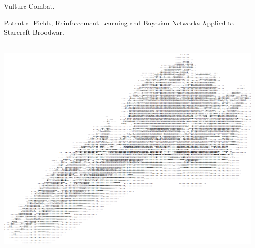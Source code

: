 \thispagestyle{empty}
\begin{center}
	\Huge
	Vulture Combat.
	
	\Large
	Potential Fields, Reinforcement Learning and Bayesian Networks Applied to Starcraft Broodwar.
	
	\vspace*{1.5in}~\\
	\hspace*{-1in}
    \includegraphics[scale=0.60]{Figures/FrontPage/FrontPage.png}
			
\end{center}



